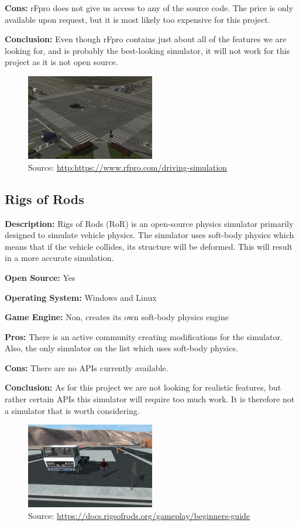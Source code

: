 \textbf{Cons:} rFpro does not give us access to any of the source code. The price is only available upon request, but it is most likely too expensive for this project. 

\textbf{Conclusion:} Even though rFpro contains just about all of the features we are looking for, and is probably the best-looking simulator, it will not work for this project as it is not open source. 

\begin{figure}[H]
    \centering
    \includegraphics[width=0.5\textwidth]{Simulators/rFpro.jpg}
    \caption{Source: \url{http:https://www.rfpro.com/driving-simulation}}
\end{figure}

\subsection{Rigs of Rods}
\textbf{Description:} Rigs of Rods (RoR) is an open-source physics simulator primarily designed to simulate vehicle physics. The simulator uses soft-body physics which means that if the vehicle collides, its structure will be deformed. This will result in a more accurate simulation.

\textbf{Open Source:} Yes

\textbf{Operating System:} Windows and Linux

\textbf{Game Engine:} Non, creates its own soft-body physics engine

\textbf{Pros:} There is an active community creating modifications for the simulator. Also, the only simulator on the list which uses soft-body physics. 

\textbf{Cons:} There are no APIs currently available. 

\textbf{Conclusion:} As for this project we are not looking for realistic features, but rather certain APIs this simulator will require too much work. It is therefore not a simulator that is worth considering. 

\begin{figure}[H]
    \centering
    \includegraphics[width=0.5\textwidth]{Simulators/RoR.png}
    \caption{Source: \url{https://docs.rigsofrods.org/gameplay/beginners-guide}}
\end{figure}



